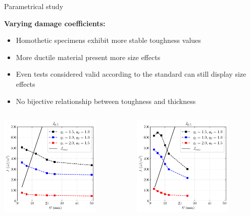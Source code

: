 \documentclass[9pt]{beamer}
\begin{document}
\begin{frame}{Parametrical study}

	\textcolor{MINESBlue}{\textbf{Varying damage coefficients:}}
	\vspace{0.1cm}
	\normalsize
	\begin{itemize}
		\item Homothetic specimens exhibit more stable toughness values
		\vspace{0.1cm}
		\item More ductile material present more size effects
		\vspace{0.1cm}
		\item Even tests considered valid according to the standard can still display size effects
		\vspace{0.1cm}
		\item No bijective relationship between toughness and thickness
	\end{itemize}
	
    \begin{columns}
        \centering
        \includegraphics[width=0.75\textwidth]{Images/plot_comp_homo_q1_q2.pdf}
        
        \centering
        \includegraphics[width=0.75\textwidth]{Images/plot_comp_12_5_q1_q2.pdf}
    \end{columns}
    

\end{frame}
\end{document}
